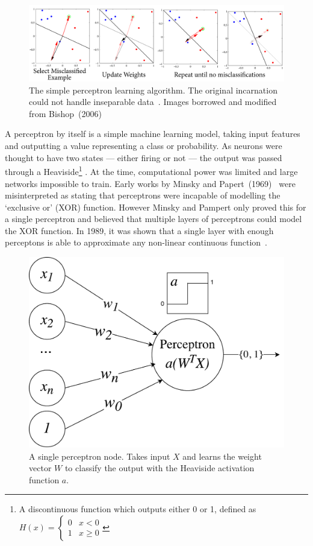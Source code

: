 \documentclass[12pt, twoside]{book}
\renewcommand\emph[1]{\textit{\color{USred}{#1}}}
\begin{document}
\begin{figure}[h]
\label{perceptron}
\centering\includegraphics[width=1\linewidth]{perceptron.png}
\caption{The simple perceptron learning algorithm. The original incarnation could not handle inseparable data~\cite{rosenblatt1958perceptron}. Images borrowed and modified from Bishop~(2006)~\cite{prml} }
\end{figure}

A perceptron by itself is a simple machine learning model, taking input features  and outputting a value representing a class or probability. As neurons were thought to have two states --- either firing or not --- the output was passed through a Heaviside\footnote{A discontinuous function which outputs either 0 or 1, defined as $ H(x)=\begin{cases} 
      0 & x < 0 \\
      1 & x \geq 0 
   \end{cases}
$} \emph{activation function}. At the time, computational power was limited and large networks impossible to train. Early works by Minsky and Papert~(1969)~\cite{minsky1969perceptrons} were misinterpreted as stating that perceptrons were incapable of modelling the `exclusive or' (XOR) function. However Minsky and Pampert only proved this for a single perceptron and believed that multiple layers of perceptrons could model the XOR function. In 1989, it was shown that a single layer with enough perceptons is able to approximate any non-linear continuous function~\cite{nnuniversalapprox}.


\begin{figure}[h]
\label{perceptronvis}
\centering\includegraphics[width=0.5\linewidth]{perceptron.pdf}
\caption{A single perceptron node. Takes input $X$ and learns the weight vector $W$ to classify the output with the Heaviside activation function $a$.}
\end{figure}
\end{document}

